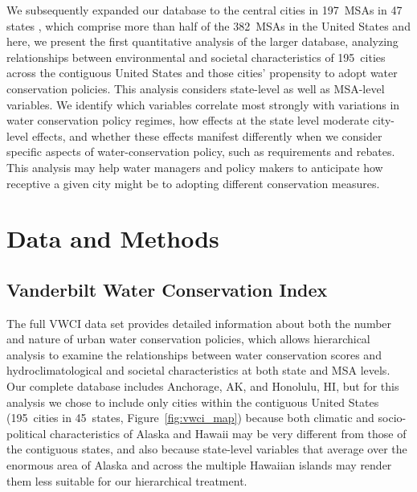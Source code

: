 \documentclass[draft,linenumbers]{agujournal}
\begin{document}
We subsequently expanded our database to the central cities in
197~MSAs in 47 states \citep{hess:vwci:2017},
which comprise more than half of the 382~MSAs in the United States
\citep{census:population:2015} and here, we present the first quantitative
analysis of the larger database, analyzing relationships between environmental
and societal characteristics of 195~cities across the contiguous
United States and those cities' propensity to adopt water conservation policies.
This analysis considers state-level as well as MSA-level variables. We identify
which variables
correlate most strongly with
variations in water conservation policy regimes,
how effects at the state level moderate city-level effects, and whether these
effects manifest differently when we consider specific aspects of
water-conservation policy, such as requirements and rebates.
This analysis may help water managers and policy makers to anticipate how
receptive a given city might be to adopting different conservation measures.

\section{Data and Methods}
\label{sec:data.methods}
\subsection{Vanderbilt Water Conservation Index}
%
%
%

%
%



The full VWCI data set provides detailed information about both the number and
nature of urban water conservation policies, which  allows hierarchical analysis
to examine the relationships between water conservation scores and
hydroclimatological and societal characteristics at both state and MSA levels.
Our complete database includes Anchorage, AK, and Honolulu, HI, but for this
analysis we chose to include only cities within the contiguous United States
(195~cities in 45~states,
Figure~\ref{fig:vwci_map})
because both
climatic and socio-political characteristics of Alaska and Hawaii may be very
different from those of the contiguous states, and also because state-level
variables that average over the enormous area of Alaska and across the multiple
Hawaiian islands may render them less suitable for our hierarchical treatment.
\end{document}
